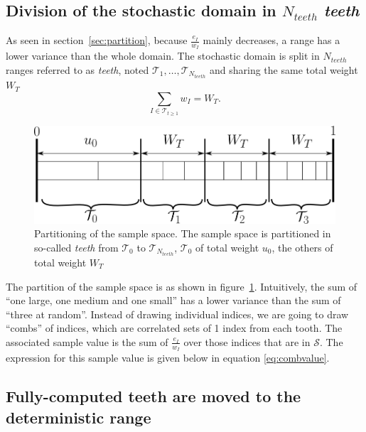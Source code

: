\documentclass[./thesis.tex]{subfiles}
\begin{document}
\subsection{Division of the stochastic domain in $N_{teeth}$ \emph{teeth}}

As seen in section~\ref{sec:partition}, because $\frac{e_I}{w_I}$ mainly decreases, a range has a lower variance than the whole domain. The stochastic domain is split in $N_{teeth}$ ranges referred to as \emph{teeth}, noted $\mathcal{T}_1,\ldots,\mathcal{T}_{N_{teeth}}$ and sharing the same total weight $W_T$
\begin{equation}
\sum_{I \in \mathcal{T}_{t \geq 1}} w_I=W_T.
\end{equation}

 \begin{figure}[h!]
	\begin{center}
	\includegraphics[width=0.9\columnwidth]{figures/pt2/teeth}
	\end{center}
	\caption{Partitioning of the sample space.
		The sample space is partitioned in so-called \emph{teeth} from $\mathcal{T}_0$ to $\mathcal{T}_{N_{teeth}}$, $\mathcal{T}_0$ of total weight $u_0$, the others of total weight $W_T$}
	\label{fig:teeth}
\end{figure}

The partition of the sample space is as shown in figure~\ref{fig:teeth}.
Intuitively, the sum of ``one large, one medium and one small'' has a lower variance than the sum of ``three at random''. Instead of drawing individual indices, we are going to draw ``combs'' of indices, which are correlated sets of 1 index from each tooth. The associated sample value is the sum of $\frac{e_I}{w_I}$ over those indices that are in $\mathcal{S}$.  The expression for this sample value is given below in equation \ref{eq:combvalue}.

\subsection{Fully-computed teeth are moved to the deterministic range}
\end{document}
